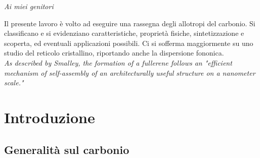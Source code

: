 \documentclass[a4paper,titlepage]{book}
\newenvironment{abstract}%
{\cleardoublepage%
	\thispagestyle{empty}%
	\null \vfill\begin{center}%
		\bfseries \abstractname \end{center}}%
{\vfill\null}
\begin{document}
	
	\begin{frontespizio}
	\begin{Preambolo*}
		\usepackage{fourier}
		\newcommand{\VOF}{\textsc{vof}}
	\end{Preambolo*}
	\end{frontespizio}

\null{}
\begin{flushright}
	\textit{Ai miei genitori}
\end{flushright}
\null
\newpage

\begin{abstract}
	Il presente lavoro è volto ad eseguire una rassegna degli allotropi del carbonio. Si classificano e si evidenziano caratteristiche, proprietà fisiche, sintetizzazione e scoperta, ed eventuali applicazioni possibili. Ci si sofferma maggiormente su uno studio del reticolo cristallino, riportando anche la dispersione fononica.\\
	
	
	\textit{As described by Smalley, the formation of a fullerene follows an "efficient mechanism of self-assembly of an architecturally useful structure on a nanometer scale."} 
\end{abstract}

\tableofcontents
\chapter{Introduzione}

\section{Generalità sul carbonio}
\end{document}
